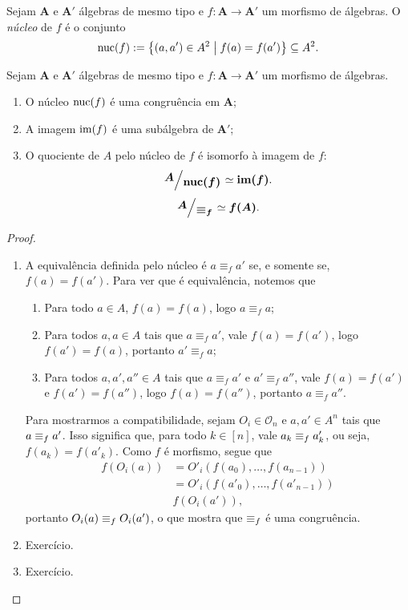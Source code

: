 \begin{definition}
Sejam $\bm A$ e $\bm A'$ álgebras de mesmo tipo e $f\colon \bm A \to \bm A'$ um morfismo de álgebras. O \emph{núcleo} de $f$ é o conjunto
		\begin{equation*}
			\operatorname{nuc}(f) := \left\{{(a,a') \in A^2}\;\middle\vert\;{f(a) = f(a')}\right\} \subseteq A^2.
		\end{equation*}
\end{definition}

\begin{proposition}
Sejam $\bm A$ e $\bm A'$ álgebras de mesmo tipo e $f\colon \bm A \to \bm A'$ um morfismo de álgebras.
	\begin{enumerate}
		\item O núcleo $\operatorname{nuc}(f)$ é uma congruência em $\bm A$;
		\item A imagem $\operatorname{im}(f)$ é uma subálgebra de $\bm A'$;
		\item O quociente de $A$ pelo núcleo de $f$ é isomorfo à imagem de $f$:
			\begin{equation*}
				\bm{\quo{A}{\nuc(f)}} \simeq \bm{\im(f)}.
			\end{equation*}
			\begin{equation*}
				\bm{\quo{A}{\congr_f}} \simeq \bm{f(A)}.
			\end{equation*}
	\end{enumerate}
\end{proposition}
\begin{proof}
	\begin{enumerate}
		\item A equivalência definida pelo núcleo é $a \equiv_f a'$ se, e somente se, $f(a)=f(a')$. Para ver que é equivalência, notemos que
		\begin{enumerate}
			\item Para todo $a \in A$, $f(a)=f(a)$, logo $a \equiv_f a$;
			\item Para todos $a,a \in A$ tais que $a \equiv_f a'$, vale $f(a)=f(a')$, logo $f(a')=f(a)$, portanto $a' \equiv_f a$;
			\item Para todos $a,a',a'' \in A$ tais que $a \equiv_f a'$ e $a' \equiv_f a''$, vale $f(a)=f(a')$ e $f(a')=f(a'')$, logo $f(a)=f(a'')$, portanto $a \equiv_f a''$.
		\end{enumerate}

		Para mostrarmos a compatibilidade, sejam $O_i \in \mathcal O_n$ e $a,a' \in A^n$ tais que $a \equiv_f a'$. Isso significa que, para todo $k \in [n]$, vale $a_k \equiv_f a'_k$, ou seja, $f(a_k)=f(a'_k)$. Como $f$ é morfismo, segue que
			\begin{align*}
				f(O_i(a))	&= O'_i(f(a_0),\ldots,f(a_{n-1})) \\
							&= O'_i(f(a'_0),\ldots,f(a'_{n-1})) \\
							& f(O_i(a')),
			\end{align*}
		portanto $O_i(a) \equiv_f O_i(a')$, o que mostra que $\equiv_f$ é uma congruência.

		\item Exercício.

		\item Exercício.
	\end{enumerate}
\end{proof}
